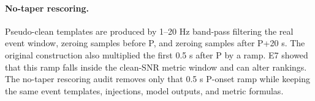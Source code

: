 \documentclass[review,12pt,authoryear]{elsarticle}
\begin{document}
\paragraph{No-taper rescoring.}
Pseudo-clean templates are produced by 1--20 Hz band-pass filtering the real event window, zeroing samples before P, and zeroing samples after P+20 s. The original construction also multiplied the first 0.5 s after P by a ramp. E7 showed that this ramp falls inside the clean-SNR metric window and can alter rankings. The no-taper rescoring audit removes only that 0.5 s P-onset ramp while keeping the same event templates, injections, model outputs, and metric formulas.

\FloatBarrier
\clearpage

\end{document}
